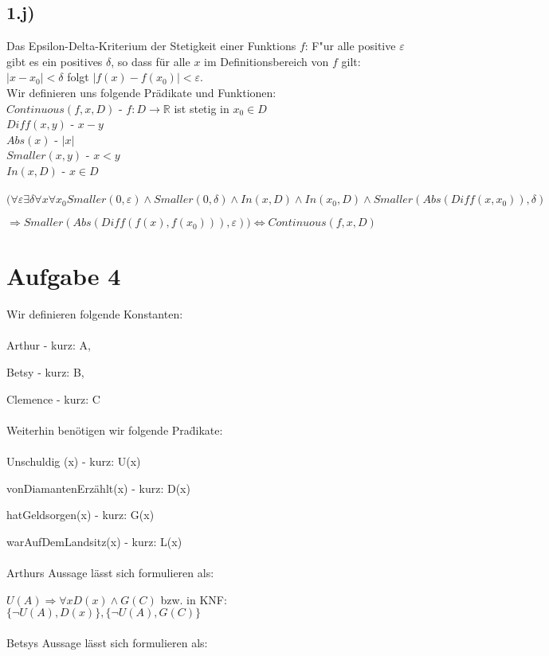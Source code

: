 \documentclass[a4paper]{article}
\begin{document}
\subsection*{1.j)}
Das Epsilon-Delta-Kriterium der Stetigkeit einer Funktions $f$: 
\glqq F"ur alle positive $\varepsilon$ gibt es ein positives $\delta$, so dass f\"ur alle $x$ im Definitionsbereich von $f$ gilt: $\left| x - x_0 \right| < \delta$ folgt $\left| f(x) - f(x_0) \right| < \varepsilon$.\grqq \\
Wir definieren uns folgende Pr\"adikate und Funktionen: \\
$Continuous(f,x,D)$ - $f : D \rightarrow  \mathbb{R} $ ist stetig in $x_0 \in D$ \\
$Diff(x,y)$ - $x - y$ \\
$Abs(x)$ - $\left| x \right|$ \\
$Smaller(x,y)$ - $x < y$ \\
$In(x,D)$ - $x \in D$ \\
\\
$(\forall \varepsilon \exists \delta \forall x  \forall x_0 Smaller(0,\varepsilon) \land Smaller(0,\delta) \land In(x,D) \land In(x_0,D) \land Smaller(Abs(Diff(x,x_0)) , \delta)$ 

$\Rightarrow Smaller(Abs(Diff(f(x),f(x_0))) , \varepsilon)) \Leftrightarrow Continuous(f,x,D)$

\newpage

\section*{Aufgabe 4}

Wir definieren folgende Konstanten:\\
\\
Arthur - kurz: A,

Betsy - kurz: B,

Clemence - kurz: C\\
\\
Weiterhin ben\"otigen wir folgende Pra\"dikate:\\
\\
Unschuldig (x) - kurz: U(x)

vonDiamantenErz\"ahlt(x) - kurz: D(x)

hatGeldsorgen(x) - kurz: G(x)

warAufDemLandsitz(x) - kurz: L(x)\\
\\
Arthurs Aussage l\"asst sich formulieren als:

$U(A) \Rightarrow \forall x D(x) \land G(C)$ bzw. in KNF: $\{\neg U(A), D(x)\}, \{\neg U(A), G(C)\}$\\
\\
Betsys Aussage l\"asst sich formulieren als:
\end{document}

